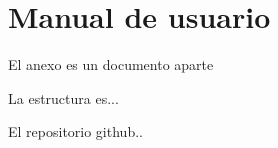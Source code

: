 \chapter{Manual de usuario}\label{anexo:manual}

El anexo es un documento aparte

La estructura es...

El repositorio github..